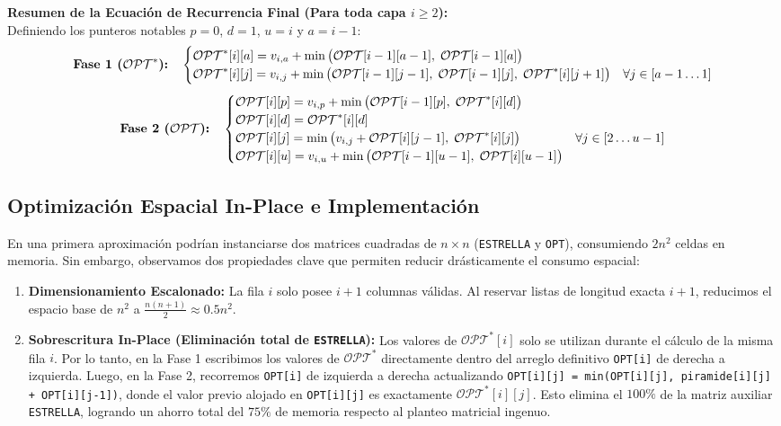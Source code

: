 \vspace{1ex}
\noindent\textbf{Resumen de la Ecuación de Recurrencia Final (Para toda capa $i \geq 2$):} \\
Definiendo los punteros notables $p = 0$, $d = 1$, $u = i$ y $a = i-1$:
\[
    \text{\textbf{Fase 1 ($\mathcal{OPT}^*$):}} \quad
    \begin{cases}
        \mathcal{OPT}^*[i][a] = v_{i,a} + \min\big(\mathcal{OPT}[i-1][a-1], \; \mathcal{OPT}[i-1][a]\big) \\
        \mathcal{OPT}^*[i][j] = v_{i,j} + \min\big(\mathcal{OPT}[i-1][j-1], \; \mathcal{OPT}[i-1][j], \; \mathcal{OPT}^*[i][j+1]\big) & \forall j \in [a-1 \dots 1]
    \end{cases}
\]
\[
    \text{\textbf{Fase 2 ($\mathcal{OPT}$):}} \quad
    \begin{cases}
        \mathcal{OPT}[i][p] = v_{i,p} + \min\big(\mathcal{OPT}[i-1][p], \; \mathcal{OPT}^*[i][d]\big) \\
        \mathcal{OPT}[i][d] = \mathcal{OPT}^*[i][d] \\
        \mathcal{OPT}[i][j] = \min\big(v_{i,j} + \mathcal{OPT}[i][j-1], \; \mathcal{OPT}^*[i][j]\big) & \forall j \in [2 \dots u-1] \\
        \mathcal{OPT}[i][u] = v_{i,u} + \min\big(\mathcal{OPT}[i-1][u-1], \; \mathcal{OPT}[i][u-1]\big)
    \end{cases}
\]

\subsection{Optimización Espacial In-Place e Implementación}\label{rec:codigo}

En una primera aproximación podrían instanciarse dos matrices cuadradas de $n \times n$ (\verb|ESTRELLA| y \verb|OPT|), consumiendo $2n^2$ celdas en memoria. Sin embargo, observamos dos propiedades clave que permiten reducir drásticamente el consumo espacial:
\begin{enumerate}
    \item \textbf{Dimensionamiento Escalonado:} La fila $i$ solo posee $i+1$ columnas válidas. Al reservar listas de longitud exacta $i+1$, reducimos el espacio base de $n^2$ a $\frac{n(n+1)}{2} \approx 0.5n^2$.
    \item \textbf{Sobrescritura In-Place (Eliminación total de \texttt{ESTRELLA}):} Los valores de $\mathcal{OPT}^*[i]$ solo se utilizan durante el cálculo de la misma fila $i$. Por lo tanto, en la Fase 1 escribimos los valores de $\mathcal{OPT}^*$ directamente dentro del arreglo definitivo \verb|OPT[i]| de derecha a izquierda. Luego, en la Fase 2, recorremos \verb|OPT[i]| de izquierda a derecha actualizando \verb|OPT[i][j] = min(OPT[i][j], piramide[i][j] + OPT[i][j-1])|, donde el valor previo alojado en \verb|OPT[i][j]| es exactamente $\mathcal{OPT}^*[i][j]$. Esto elimina el $100\%$ de la matriz auxiliar \verb|ESTRELLA|, logrando un ahorro total del $75\%$ de memoria respecto al planteo matricial ingenuo.
\end{enumerate}

